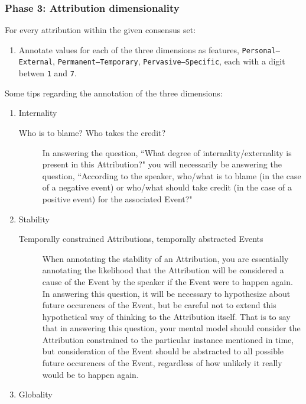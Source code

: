 \documentclass[a4paper,12pt]{article}
\begin{document}
    \subsubsection{Phase 3: Attribution dimensionality}
    For every attribution within the given consensus set:
        \begin{enumerate}
            \item Annotate values for each of the three dimensions as features, \texttt{Personal--External}, \texttt{Permanent--Temporary}, \texttt{Pervasive--Specific}, each with a digit betwen \texttt{1} and \texttt{7}.
        \end{enumerate}
    \noindent Some tips regarding the annotation of the three dimensions:
        \begin{enumerate}
        \item Internality
            \begin{description}
                \item[Who is to blame? Who takes the credit?] In answering the question, ``What degree of internality/externality is present in this Attribution?" you will necessarily be answering the question, ``According to the speaker, who/what is to blame (in the case of a negative event) or who/what should take credit (in the case of a positive event) for the associated Event?"
            \end{description}
        \item Stability
            \begin{description}
                \item[Temporally constrained Attributions, temporally abstracted Events] When annotating the stability of an Attribution, you are essentially annotating the likelihood that the Attribution will be considered a cause of the Event by the speaker if the Event were to happen again. In answering this question, it will be necessary to hypothesize about future occurences of the Event, but be careful not to extend this hypothetical way of thinking to the Attribution itself. That is to say that in answering this question, your mental model should consider the Attribution constrained to the particular instance mentioned in time, but consideration of the Event should be abstracted to all possible future occurences of the Event, regardless of how unlikely it really would be to happen again.
            \end{description}
        \item Globality
            \begin{description}

\end{description}
\end{enumerate}
\end{document}
